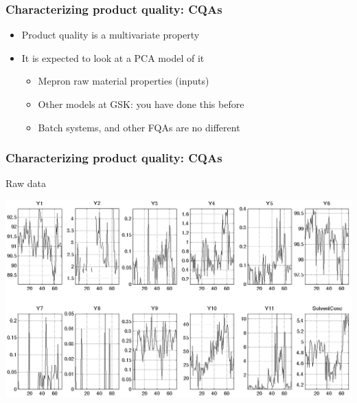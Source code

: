 \begin{frame}\frametitle{Characterizing product quality: CQAs}

\begin{itemize}
	\item	Product quality is a multivariate property
	
	\item	It is expected to look at a PCA model of it
	
		\begin{itemize}
			\item	Mepron raw material properties (inputs)

			\item	Other models at GSK: you have done this before
			
			\item	Batch systems, and other FQAs are no different
		\end{itemize}
\end{itemize}

\end{frame}

\begin{frame}\frametitle{Characterizing product quality: CQAs}

Raw data

\begin{center}
	\includegraphics[width=\textwidth]{images/fmc/fmc-Z-raw-data.png}
\end{center}

\end{frame}

